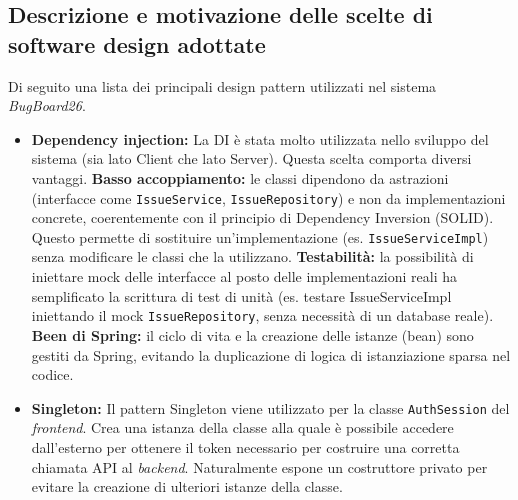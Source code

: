 \documentclass[a4paper,12pt]{article}
\begin{document}
\subsection{Descrizione e motivazione delle scelte di software design adottate} Di seguito una lista dei principali design pattern utilizzati nel sistema \textit{BugBoard26}. 
\begin{itemize}
    \item \textbf{Dependency injection:} La DI è stata molto utilizzata nello sviluppo del sistema (sia lato Client che lato Server). Questa scelta comporta diversi vantaggi. 
    \textbf{Basso accoppiamento:} le classi dipendono da astrazioni (interfacce come \texttt{IssueService}, \texttt{IssueRepository}) e non da implementazioni concrete, coerentemente con il principio di Dependency Inversion (SOLID). Questo permette di sostituire un'implementazione (es. \texttt{IssueServiceImpl}) senza modificare le classi che la utilizzano. 
    \textbf{Testabilità:} la possibilità di iniettare mock delle interfacce al posto delle implementazioni reali ha semplificato la scrittura di test di unità (es. testare IssueServiceImpl iniettando il mock \texttt{IssueRepository}, senza necessità di un database reale). 
    \textbf{Been di Spring:} il ciclo di vita e la creazione delle istanze (bean) sono gestiti da Spring, evitando la duplicazione di logica di istanziazione sparsa nel codice.
    \item \textbf{Singleton:} Il pattern Singleton viene utilizzato per la classe \texttt{AuthSession} del \textit{frontend}. Crea una istanza della classe alla quale è possibile accedere dall'esterno per ottenere il token necessario per costruire una corretta chiamata API al \textit{backend}. Naturalmente espone un costruttore privato per evitare la creazione di ulteriori istanze della classe. 

\end{itemize}
\end{document}
